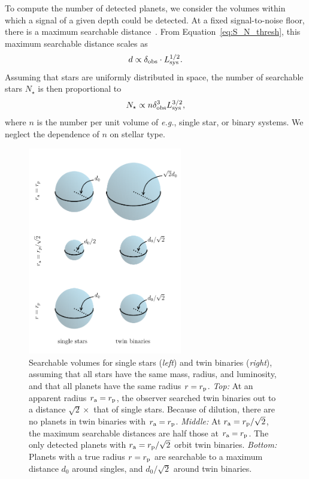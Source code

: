 \documentclass[12pt,modern]{aastex61}
\renewcommand{\a}{_{\rm a}}
\newcommand{\p}{_{\rm p}}
\begin{document}
To compute the number of detected planets, we consider the volumes
within which a signal of a given depth could be detected. At a fixed
signal-to-noise floor, there is a maximum searchable
distance~\citep{pepper_using_2003,pepper_searching_2005}.  From
Equation~\ref{eq:S_N_thresh}, this maximum searchable distance scales
as
\begin{equation}
    d \propto \delta_{\rm obs} \cdot L_{\rm sys}^{1/2}.
\end{equation}
Assuming that stars are uniformly distributed in space, the number of
searchable stars $N_\star$ is then proportional to
\begin{equation}
    N_\star \propto n \delta_{\rm obs}^3 L_{\rm sys}^{3/2},
\label{eq:N_searchable_prop}
\end{equation}
where $n$ is the number per unit volume of {\it e.g.}, single star, or
binary systems.  We neglect the dependence of $n$ on stellar type.


\begin{figure}[!tb]
    \begin{center}
        \includegraphics[width=0.6\textwidth]{figures/visualize_volumes.pdf}
    \end{center}
    \caption{
        Searchable volumes for single stars ({\it left}) and twin
        binaries ({\it right}), assuming that all stars have the same
        mass, radius, and luminosity, and that all planets have the
        same radius $r=r\p$.
        {\it Top:} At an apparent radius $r\a=r\p$, the observer
        searched twin binaries out to a distance $\sqrt{2}\times$ that
        of single stars.  Because of dilution, there are no planets in
        twin binaries with $r\a=r\p$.
        {\it Middle:} At $r\a=r\p/\sqrt{2}$, the maximum searchable
        distances are half those at $r\a=r\p$.  The only detected
        planets with $r\a=r\p/\sqrt{2}$ orbit twin binaries.
        {\it Bottom:} Planets with a true radius $r=r\p$ are
        searchable to a maximum distance $d_0$ around singles, and
        $d_0/\sqrt{2}$ around twin binaries.
    }
    \label{fig:model_1_volumes}
\end{figure}
\end{document}
